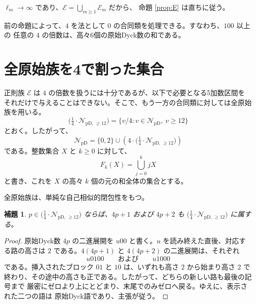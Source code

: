 \documentclass[12pt]{ltjsarticle}
\theoremstyle{plain}
\newtheorem{lemma}[theorem]{補題}
\newcommand{\NpD}{\mathcal{N}_{\mathrm{pD}}}
\newcommand{\Pset}{\bigl(\tfrac14\cdot
  \mathcal{N}_{\mathrm{pD},\,\geq12}\bigr)}
\begin{document}
$\ell_m\to\infty$ であり、$\mathcal E=\bigcup_{m\geq1}\mathcal E_m$ だから、
命題 \ref{prop:E} は直ちに従う。

前の命題によって、$4$ を法として $0$ の合同類を処理できる。すなわち、$100$ 以上の
任意の $4$ の倍数は、高々6個の原始Dyck数の和である。

\section{全原始族を4で割った集合}

正則族 $\mathcal E$ は $4$ の倍数を扱うには十分であるが、以下で必要となる5加数区間を
それだけで与えることはできない。そこで、もう一方の合同類に対しては全原始族を用いる。
\[
 \Pset=\{v/4:v\in\NpD,\ v\geq12\}
\]
とおく。したがって、
\[
 \NpD=\{0,2\}\cup(4\cdot\Pset)
\]
である。整数集合 $X$ と $k\geq0$ に対して、
\[
 F_k(X)=\bigcup_{j=0}^{k}jX
\]
と書き、これを $X$ の高々 $k$ 個の元の和全体の集合とする。

全原始族は、単純な自己相似的閉包性をもつ。

\begin{lemma}\label{lem:Pclosure}
$p\in\Pset$ ならば、$4p+1$ および $4p+2$ も $\Pset$ に属する。
\end{lemma}

\begin{proof}
原始Dyck数 $4p$ の二進展開を $u00$ と書く。$u$ を読み終えた直後、対応する路の高さは
$2$ である。$4(4p+1)$ と $4(4p+2)$ の二進展開は、それぞれ
\[
 u0100\qquad\text{および}\qquad u1000
\]
である。挿入されたブロック $01$ と $10$ は、いずれも高さ $2$ から始まり高さ $2$ で
終わり、その途中の高さも正である。したがって、どちらの新しい路も最後の記号まで
厳密にゼロより上にとどまり、末尾でのみゼロへ戻る。ゆえに、表示された二つの語は
原始Dyck語であり、主張が従う。
\end{proof}
\end{document}

